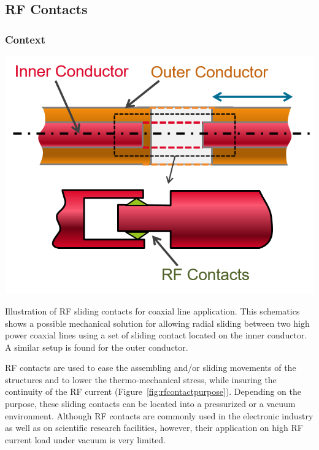 {\clearpage

\subsection{RF Contacts}\label{sec:RF_contacts}
\subsubsection{Context}

\begin{marginfigure}
	\centering
	\includegraphics[width=1.0\linewidth]{figures/chap3/RF_contacts/RF_contact_purpose}
	\caption{Illustration of RF sliding contacts for coaxial line application. This schematics shows a possible mechanical solution for allowing radial sliding between two high power coaxial lines using a set of sliding contact located on the inner conductor. A similar setup is found for the outer conductor.}
	\label{fig:rfcontactpurpose}
\end{marginfigure}

RF contacts are used to ease the assembling and/or sliding movements of the structures and to lower the thermo-mechanical stress, while insuring the continuity of the RF current (Figure~\ref{fig:rfcontactpurpose}). Depending on the purpose, these sliding contacts can be located into a pressurized or a vacuum environment. Although RF contacts are commonly used in the electronic industry as well as on scientific research facilities, however, their application on high RF current load under vacuum is very limited. 


}
